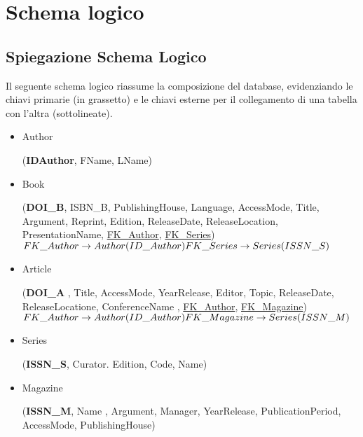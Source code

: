 \chapter{Schema logico}
	\section{Spiegazione Schema Logico}
	Il seguente schema logico riassume la composizione del database, evidenziando le chiavi primarie (in grassetto) e le chiavi esterne per il collegamento di una tabella con l'altra (sottolineate).
																			
\begin{itemize}
\subsection{Schema}

\item Author


(\textbf{IDAuthor}, FName, LName)




\item Book


(\textbf{DOI\_B}, ISBN\_B, PublishingHouse, Language, AccessMode, Title, Argument, Reprint, Edition, ReleaseDate, ReleaseLocation, PresentationName, \underline{FK\_Author}, \underline{FK\_Series})\\

	$FK\_Author \rightarrow Author(ID\_Author)\\
	 FK\_Series \rightarrow Series(ISSN\_S)$


\item Article

(\textbf{DOI\_A} , Title, AccessMode, YearRelease, Editor, Topic, ReleaseDate, ReleaseLocatione, ConferenceName , \underline{FK\_Author}, \underline{FK\_Magazine})\\

$FK\_Author \rightarrow Author(ID\_Author) \\
	 FK\_Magazine \rightarrow Series(ISSN\_M)$

\item Series


(\textbf{ISSN\_S}, Curator. Edition, Code, Name)\\



\item Magazine


(\textbf{ISSN\_M}, Name , Argument, Manager, YearRelease, PublicationPeriod, AccessMode,
PublishingHouse)\\


\end{itemize}
